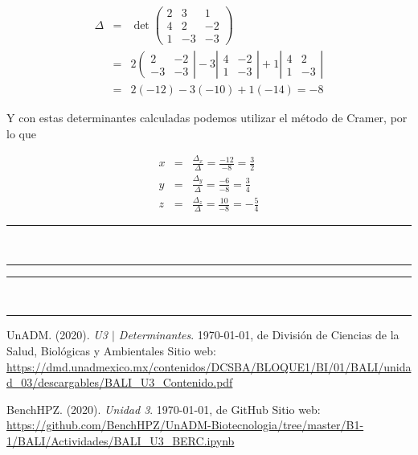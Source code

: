 \documentclass[12pt]{article}
\begin{document}
\begin{multicols}{2}
\begin{enumerate}[A.]
		\begin{eqnarray*}
			\Delta &=& \det \left(\begin{array}{rrr}
						2 & 3 & 1 \\
						4 & 2 & -2 \\
						1 & -3 & -3
						\end{array}\right) \\
				&=& 2 \left(\begin{array}{rr}
						2 & -2 \\
						-3 & -3
					\end{array}\right| 
					-3 \left|\begin{array}{rr}
						4 & -2 \\
						1 & -3
					\end{array}\right| 
					+1 \left|\begin{array}{rr}
						4 & 2 \\
						1 & -3
					\end{array}\right|  \\
				&=&  2(-12) -3(-10) +1(-14) = -8
		\end{eqnarray*}
		
		Y con estas determinantes calculadas podemos utilizar el m\'etodo de Cramer, por lo que
		
		\begin{eqnarray*}
			x &=& \frac{\Delta_x}{\Delta} = \frac{-12}{-8} = \frac{3}{2} \\
			y &=& \frac{\Delta_y}{\Delta} = \frac{-6}{-8} = \frac{3}{4} \\
			z &=& \frac{\Delta_z}{\Delta} = \frac{10}{-8} = -\frac{5}{4}
		\end{eqnarray*}
		
		\hrule\ \\\hrule

	
	\end{enumerate}
\end{multicols}


\hrule \ \\ \hrule
\begin{thebibliography}{X}

	 UnADM. (2020). \textit{U3 $|$ Determinantes}. \today, de División de Ciencias de la Salud, Biológicas y Ambientales Sitio web: \url{https://dmd.unadmexico.mx/contenidos/DCSBA/BLOQUE1/BI/01/BALI/unidad_03/descargables/BALI_U3_Contenido.pdf}
	
	 BenchHPZ. (2020). \textit{Unidad 3}. \today, de GitHub Sitio web: \url{https://github.com/BenchHPZ/UnADM-Biotecnologia/tree/master/B1-1/BALI/Actividades/BALI_U3_BERC.ipynb}
\end{thebibliography}
\end{document}
